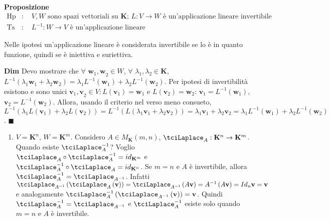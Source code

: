 \documentclass{article}
\begin{document}
\textbf{Proposizione}%
\begin{eqnarray*}
\text{Hp} &\text{: }&V,W\text{ sono spazi vettoriali su }\mathbf{K}\text{; }%
L:V\rightarrow W\text{ \`{e} un'applicazione lineare invertibile} \\
\text{Ts} &\text{: }&L^{-1}:W\rightarrow V\text{ \`{e} un'applicazione
lineare}
\end{eqnarray*}

Nelle ipotesi un'applicazione lineare \`{e} considerata invertibile se lo 
\`{e} in quanto funzione, quindi se \`{e} iniettiva e suriettiva.

\textbf{Dim} Devo mostrare che $\forall $ $\mathbf{w}_{1}\mathbf{,w}_{2}\in
W $, $\forall $ $\lambda _{1},\lambda _{2}\in \mathbf{K}$, $L^{-1}\left(
\lambda _{1}\mathbf{w}_{1}+\lambda _{2}\mathbf{w}_{2}\right) =\lambda
_{1}L^{-1}\left( \mathbf{w}_{1}\right) +\lambda _{2}L^{-1}\left( \mathbf{w}%
_{2}\right) $. Per ipotesi di invertibilit\`{a} esistono e sono unici $%
\mathbf{v}_{1}\mathbf{,v}_{2}\in V:L\left( \mathbf{v}_{1}\right) =\mathbf{w}%
_{1}$ e $L\left( \mathbf{v}_{2}\right) =\mathbf{w}_{2}$: $\mathbf{v}%
_{1}=L^{-1}\left( \mathbf{w}_{1}\right) $, $\mathbf{v}_{2}=L^{-1}\left( 
\mathbf{w}_{2}\right) $. Allora, usando il criterio nel verso meno consueto, 
$L^{-1}\left( \lambda _{1}L\left( \mathbf{v}_{1}\right) +\lambda _{2}L\left( 
\mathbf{v}_{2}\right) \right) =L^{-1}\left( L\left( \lambda _{1}\mathbf{v}%
_{1}+\lambda _{2}\mathbf{v}_{2}\right) \right) =\lambda _{1}\mathbf{v}%
_{1}+\lambda _{2}\mathbf{v}_{2}=\lambda _{1}L^{-1}\left( \mathbf{w}%
_{1}\right) +\lambda _{2}L^{-1}\left( \mathbf{w}_{2}\right) $. $\blacksquare 
$

\begin{enumerate}
\item $V=\mathbf{K}^{n}$, $W=\mathbf{K}^{m}$. Considero $A\in M_{\mathbf{K}%
}\left( m,n\right) $, $\tciLaplace _{A}:\mathbf{K}^{n}\rightarrow \mathbf{K}%
^{m}$. Quando esiste $\tciLaplace _{A}^{-1}$? Voglio $\tciLaplace _{A}\circ
\tciLaplace _{A}^{-1}=id_{\mathbf{K}^{m}}$ e $\tciLaplace _{A}^{-1}\circ
\tciLaplace _{A}=id_{\mathbf{K}^{n}}$. Se $m=n$ e $A$ \`{e} invertibile,
allora $\tciLaplace _{A}^{-1}=\tciLaplace _{A^{-1}}$. Infatti $\tciLaplace
_{A^{-1}}\left( \tciLaplace _{A}\left( \mathbf{v}\right) \right)
=\tciLaplace _{A^{-1}}\left( A\mathbf{v}\right) =A^{-1}\left( A\mathbf{v}%
\right) =Id_{n}\mathbf{v=v}$ e analogamente $\tciLaplace _{A}^{-1}\left(
\tciLaplace _{A^{-1}}\left( \mathbf{v}\right) \right) =\mathbf{v}$. Quindi $%
\tciLaplace _{A}^{-1}=\tciLaplace _{A^{-1}}$ e $\tciLaplace _{A}^{-1}$
esiste solo quando $m=n$ e $A$ \`{e} invertibile.
\end{enumerate}
\end{document}
